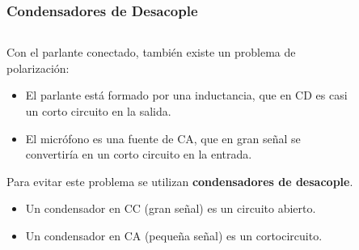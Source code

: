 \begin{frame}[t]
    \frametitle{Condensadores de Desacople}
    \begin{columns}
        \begin{column}{0.5\textwidth}
            Con el parlante conectado, también existe un problema de polarización:

            \begin{itemize}
                \item El parlante está formado por una inductancia, que en CD es casi un corto circuito en la salida. 
                \item El micrófono es una fuente de CA, que en gran señal se convertiría en un corto circuito en la entrada.
            \end{itemize}
            
            \vspace{3mm}
            Para evitar este problema se utilizan \textbf{condensadores de desacople}. 
            
            \begin{itemize}
                \item Un condensador en CC (gran señal) es un circuito abierto.
                \item Un condensador en CA (pequeña señal) es un cortocircuito. 
            \end{itemize}
        \end{column}
        \begin{column}{0.5\textwidth}
            \begin{figure}[H]
            \end{figure}
        \end{column}
    \end{columns}
    
\end{frame}

